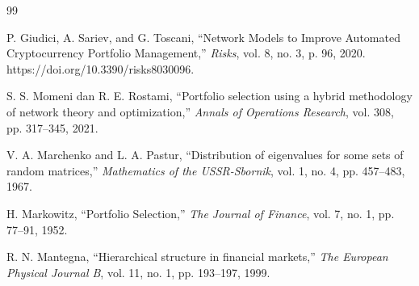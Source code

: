 \documentclass[12pt, a4paper]{report}
\begin{document}
\begin{thebibliography}{99}

P. Giudici, A. Sariev, and G. Toscani, ``Network Models to Improve Automated Cryptocurrency Portfolio Management,'' \emph{Risks},
vol. 8, no. 3, p. 96, 2020. https://doi.org/10.3390/risks8030096.

S. S. Momeni dan R. E. Rostami, ``Portfolio selection using a hybrid methodology of network theory and optimization,'' \emph{Annals of Operations Research},
vol. 308, pp. 317--345, 2021.

V. A. Marchenko and L. A. Pastur, ``Distribution of eigenvalues for some sets of random matrices,'' \emph{Mathematics of the USSR-Sbornik},
vol. 1, no. 4, pp. 457--483, 1967.

H. Markowitz, ``Portfolio Selection,'' \emph{The Journal of Finance},
vol. 7, no. 1, pp. 77--91, 1952.

R. N. Mantegna, ``Hierarchical structure in financial markets,'' \emph{The European Physical Journal B},
vol. 11, no. 1, pp. 193--197, 1999.

\end{thebibliography}
\end{document}
